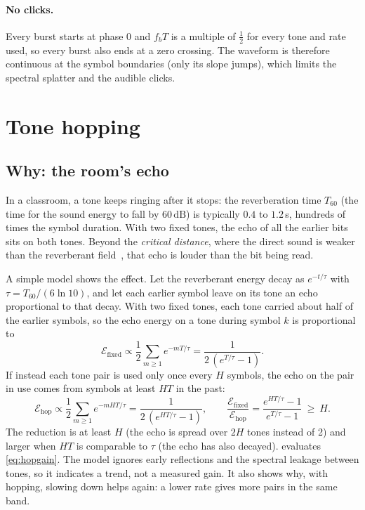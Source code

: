 \documentclass[11pt,a4paper]{article}
\newcommand{\dB}{\,\mathrm{dB}}
\theoremstyle{remark}
\begin{document}
\paragraph{No clicks.}
Every burst starts at phase 0 and $f_b T$ is a multiple of $\tfrac12$ for every tone and rate used, so every burst also ends at a zero crossing. The waveform is therefore continuous at the symbol boundaries (only its slope jumps), which limits the spectral splatter and the audible clicks.

\section{Tone hopping}
\label{sec:hop}

\subsection{Why: the room's echo}
In a classroom, a tone keeps ringing after it stops: the reverberation time $T_{60}$ (the time for the sound energy to fall by $60\dB$) is typically $0.4$ to $1.2$\,s, hundreds of times the symbol duration. With two fixed tones, the echo of all the earlier bits sits on both tones. Beyond the \emph{critical distance}, where the direct sound is weaker than the reverberant field~\cite{kuttruff}, that echo is louder than the bit being read.

A simple model shows the effect. Let the reverberant energy decay as $e^{-t/\tau}$ with $\tau = T_{60}/(6\ln 10)$, and let each earlier symbol leave on its tone an echo proportional to that decay. With two fixed tones, each tone carried about half of the earlier symbols, so the echo energy on a tone during symbol $k$ is proportional to
\begin{equation}
\mathcal{E}_{\text{fixed}} \propto \frac12 \sum_{m\ge1} e^{-mT/\tau} = \frac{1}{2\,(e^{T/\tau} - 1)}.
\end{equation}
If instead each tone pair is used only once every $H$ symbols, the echo on the pair in use comes from symbols at least $HT$ in the past:
\begin{equation}
\mathcal{E}_{\text{hop}} \propto \frac12 \sum_{m\ge1} e^{-mHT/\tau} = \frac{1}{2\,(e^{HT/\tau} - 1)}, \qquad
\frac{\mathcal{E}_{\text{fixed}}}{\mathcal{E}_{\text{hop}}} = \frac{e^{HT/\tau} - 1}{e^{T/\tau} - 1} \ \ge\ H .
\label{eq:hopgain}
\end{equation}
The reduction is at least $H$ (the echo is spread over $2H$ tones instead of 2) and larger when $HT$ is comparable to $\tau$ (the echo has also decayed).  evaluates \cref{eq:hopgain}. The model ignores early reflections and the spectral leakage between tones, so it indicates a trend, not a measured gain. It also shows why, with hopping, slowing down helps again: a lower rate gives more pairs in the same band.
\end{document}
